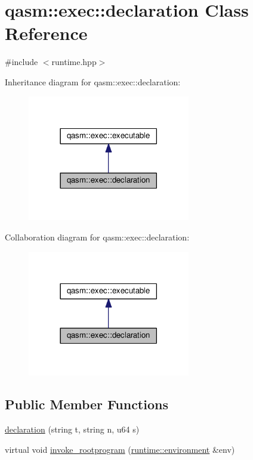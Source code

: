 \hypertarget{classqasm_1_1exec_1_1declaration}{}\section{qasm\+:\+:exec\+:\+:declaration Class Reference}
\label{classqasm_1_1exec_1_1declaration}


{\ttfamily \#include $<$runtime.\+hpp$>$}



Inheritance diagram for qasm\+:\+:exec\+:\+:declaration\+:\nopagebreak
\begin{figure}[H]
\begin{center}
\leavevmode
\includegraphics[width=201pt]{classqasm_1_1exec_1_1declaration__inherit__graph}
\end{center}
\end{figure}


Collaboration diagram for qasm\+:\+:exec\+:\+:declaration\+:\nopagebreak
\begin{figure}[H]
\begin{center}
\leavevmode
\includegraphics[width=201pt]{classqasm_1_1exec_1_1declaration__coll__graph}
\end{center}
\end{figure}
\subsection*{Public Member Functions}
\begin{DoxyCompactItemize}
\item 
\hyperlink{classqasm_1_1exec_1_1declaration_ae8f3a47af0a26055fb6fc90303defbeb}{declaration} (string t, string n, u64 s)
\item 
virtual void \hyperlink{classqasm_1_1exec_1_1declaration_a4f1396fca212fb0ce984d2cea90df0a8}{invoke\+\_\+rootprogram} (\hyperlink{classqasm_1_1runtime_1_1environment}{runtime\+::environment} \&env)
\end{DoxyCompactItemize}
